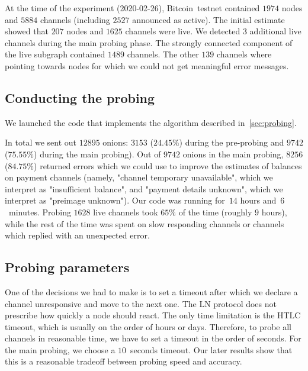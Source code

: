 At the time of the experiment (2020-02-26), Bitcoin~testnet contained $1974$ nodes and $5884$ channels (including $2527$ announced as active).
The initial estimate showed that $207$ nodes and $1625$ channels were live.
We detected $3$ additional live channels during the main probing phase.
The strongly connected component of the live subgraph contained $1489$ channels.
The other $139$ channels where pointing towards nodes for which we could not get meaningful error messages.



\subsection{Conducting the probing}

We launched the code that implements the algorithm described in~\cref{sec:probing}.

In total we sent out $12895$ onions: $3153$ ($24.45\%$) during the pre-probing and $9742$ ($75.55\%$) during the main probing).
Out of $9742$ onions in the main probing, $8256$ ($84.75\%$) returned errors which we could use to improve the estimates of balances on payment channels (namely, "channel temporary unavailable", which we interpret as "insufficient balance", and "payment details unknown", which we interpret as "preimage unknown").
Our code was running for~$14$ hours and~$6$~minutes. %
Probing $1628$ live channels took $65\%$ of the time (roughly $9$ hours), while the rest of the time was spent on slow responding channels or channels which replied with an unexpected error.

\subsection{Probing parameters}
One of the decisions we had to make is to set a timeout after which we declare a channel unresponsive and move to the next one.
The LN protocol does not prescribe how quickly a node should react.
The only time limitation is the HTLC timeout, which is usually on the order of hours or days.
Therefore, to probe all channels in reasonable time, we have to set a timeout in the order of seconds.
For the main probing, we choose a $10$~seconds timeout.
Our later results show that this is a reasonable tradeoff between probing speed and accuracy.

